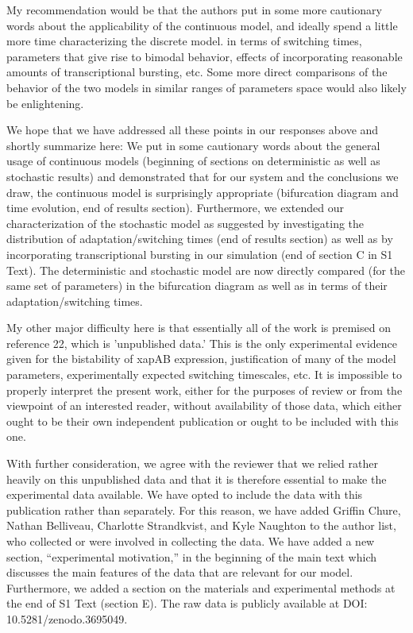 \documentclass[11pt,letterpaper]{article}
\begin{document}
\begin{review}
My recommendation would be that the authors put in some more cautionary words about the applicability of the continuous model, and ideally spend a little more time characterizing the discrete model. in terms of switching times, parameters that give rise to bimodal behavior, effects of incorporating reasonable amounts of transcriptional bursting, etc. Some more direct comparisons of the behavior of the two models in similar ranges of parameters space would also likely be enlightening.
\end{review}

\begin{response}
We hope that we have addressed all these points in our responses above
and shortly summarize here: We put in some cautionary words about the
general usage of continuous models (beginning of sections on deterministic as well as stochastic results) and demonstrated that for our system
and the conclusions we draw, the continuous model is surprisingly appropriate (bifurcation diagram and time evolution, end of results section).
Furthermore, we extended our characterization of the stochastic model as
suggested by investigating the distribution of adaptation/switching
times (end of results section) as well as by incorporating transcriptional bursting in our
simulation (end of section C in S1 Text). The deterministic and stochastic model are now directly
compared (for the same set of parameters) in the bifurcation diagram as
well as in terms of their adaptation/switching times.
\end{response}

\begin{review}
My other major difficulty here is that essentially all of the work is
premised on reference 22, which is 'unpublished data.' This is the only
experimental evidence given for the bistability of xapAB expression,
justification of many of the model parameters, experimentally expected
switching timescales, etc. It is impossible to properly interpret the
present work, either for the purposes of review or from the viewpoint of
an interested reader, without availability of those data, which either
ought to be their own independent publication or ought to be included
with this one.
\end{review}

\begin{response}
With further consideration, we agree with the reviewer that we relied
rather heavily on this unpublished data and that it is therefore
essential to make the experimental data available.
We have opted to include the data with this publication rather than
separately. For this reason, we have added Griffin Chure, Nathan Belliveau, Charlotte Strandkvist, and Kyle Naughton to the author list, who collected or were involved in collecting the data. We have added a new section, ``experimental motivation,'' in
the beginning of the main text which discusses the main features of the
data that are relevant for our model. Furthermore, we added a section on
the materials and experimental methods at the end of S1 Text (section
E).
The raw data is
publicly available at DOI: 10.5281/zenodo.3695049.
\end{response}




\end{document}
